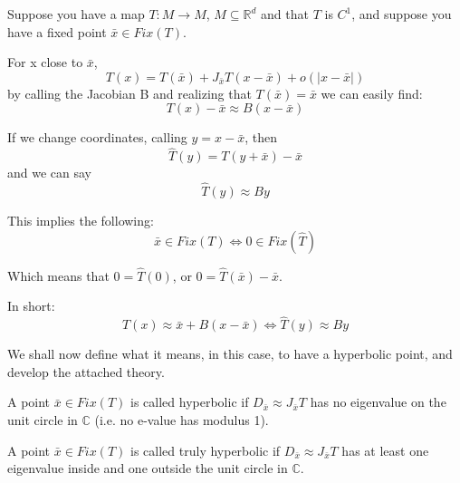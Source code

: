 Suppose you have a map $T:M\rightarrow M$, $M\subseteq\mathbb{R}^d$ and that $T$ is $C^1$, and suppose you have a fixed point $\bar{x}\in Fix(T)$.

For x close to $\bar{x}$, \begin{equation*}
    T(x)=T(\bar{x})+J_{\bar{x}}T(x-\bar{x})+o(|x-\bar{x}|)
\end{equation*}
by calling the Jacobian B and realizing that $T(\bar{x})=\bar{x}$ we can easily find:\begin{equation*}
    T(x)-\bar{x}\approx B(x-\bar{x})
\end{equation*}

If we change coordinates, calling $y=x-\bar{x}$, then \begin{equation*}
    \hat{T}(y)=T(y+\bar{x})-\bar{x}
\end{equation*}
and we can say \begin{equation*}
    \hat{T}(y)\approx By
\end{equation*}

This implies the following: \begin{equation*}
    \bar{x}\in Fix(T)\iff 0\in Fix(\hat{T})
\end{equation*}

Which means that $0=\hat{T}(0)$, or $0=\hat{T}(\bar{x})-\bar{x}$.

In short:\begin{equation*}
    T(x)\approx \bar{x}+B(x-\bar{x})\iff \hat{T}(y)\approx By
\end{equation*}

We shall now define what it means, in this case, to have a hyperbolic point, and develop the attached theory.

\begin{definition}
    A point $\bar{x}\in Fix(T)$ is called hyperbolic if $D_{\bar{x}}\approx J_{\bar{x}}T$ has no eigenvalue on the unit circle in $\mathbb{C}$ (i.e. no e-value has modulus 1).
\end{definition}

\begin{definition}
    A point $\bar{x}\in Fix(T)$ is called truly hyperbolic if $D_{\bar{x}}\approx J_{\bar{x}}T$ has at least one eigenvalue inside and one outside the unit circle in $\mathbb{C}$.
\end{definition}


